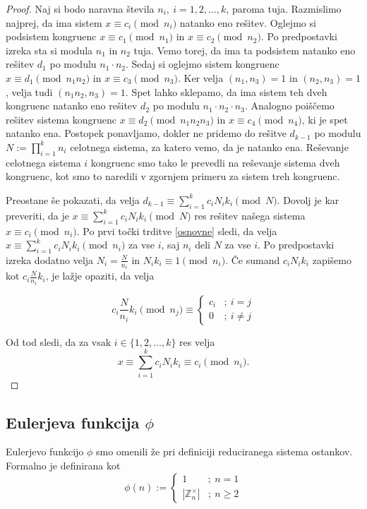 \documentclass[12pt, a4paper]{article}
\begin{document}
\begin{proof}
Naj si bodo naravna števila $n_{i},\ i=1,2,\dots,k$, paroma tuja. Razmislimo najprej, da ima sistem $x\equiv c_{i} \pmod{n_{i}}$ natanko eno rešitev. Oglejmo si podsistem kongruenc $x\equiv c_{1} \pmod{n_{1}}$ in $x\equiv c_{2} \pmod{n_{2}}$. Po predpostavki izreka sta si modula $n_{1}$ in $n_{2}$ tuja. Vemo torej, da ima ta podsistem natanko eno rešitev $d_{1}$ po modulu $n_{1}\cdot n_{2}$. Sedaj si oglejmo sistem kongruenc  $x\equiv d_{1} \pmod{n_{1} n_{2}}$ in $x\equiv c_{3} \pmod{n_{3}}$. Ker velja $(n_{1},n_{3})=1$ in $(n_{2},n_{3})=1$, velja tudi $(n_{1}n_{2},n_{3})=1$. Spet lahko sklepamo, da ima sistem teh dveh kongruenc natanko eno rešitev $d_{2}$ po modulu $n_{1}\cdot n_{2}\cdot n_{3}$. Analogno poiščemo rešitev sistema kongruenc $x\equiv d_{2} \pmod{n_{1} n_{2} n_{3}}$ in $x\equiv c_{4} \pmod{n_4}$, ki je spet natanko ena. Postopek ponavljamo, dokler ne pridemo do rešitve $d_{k-1}$ po modulu $N:=\prod_{i=1}^{k}n_{i}$ celotnega sistema, za katero vemo, da je natanko ena. Reševanje celotnega sistema $i$ kongruenc smo tako le prevedli na reševanje sistema dveh kongruenc, kot smo to naredili v zgornjem primeru za sistem treh kongruenc.

Preostane še pokazati, da velja $d_{k-1}\equiv \sum_{i=1}^{k}c_{i}N_{i}k_{i} \pmod N$. Dovolj je kar preveriti, da je $x\equiv \sum_{i=1}^{k}c_{i}N_{i}k_{i} \pmod N$ res rešitev našega sistema $x\equiv c_{i} \pmod{n_{i}}$. Po prvi točki trditve \ref{osnovne} sledi, da velja $x\equiv \sum_{i=1}^{k}c_{i}N_{i}k_{i} \pmod{n_{i}}$ za vse $i$, saj $n_{i}$ deli $N$ za vse $i$. Po predpostavki izreka dodatno velja $N_{i}=\frac{N}{n_{i}}$ in $N_{i}k_{i}\equiv 1 \pmod{n_{i}}$. Če sumand $c_{i}N_{i}k_{i}$ zapišemo kot $c_{i}\frac{N}{n_{i}}k_{i}$, je lažje opaziti, da velja

\[
 c_{i}\frac{N}{n_{i}}k_{i} \pmod{n_{j}}\equiv
\begin{cases}
c_{i} &;\ i=j \\
0 &;\ i\neq j
\end{cases}
\]

Od tod sledi, da za vsak $i\in \{1,2,\dots,k\}$ res velja
$$
x\equiv \sum_{i=1}^{k}c_{i}N_{i}k_{i} \equiv c_{i} \pmod{n_{i}}.
$$
\end{proof}

\subsection{Eulerjeva funkcija $\phi$}
 
Eulerjevo funkcijo $\phi$ smo omenili že pri definiciji reduciranega sistema ostankov. Formalno je definirana kot
\[
\phi(n):=
\begin{cases}
1 &;\ n=1 \\
|\mathbb{Z}_{n}^{\times}| &;\ n\geq 2
\end{cases}
\]
\end{document}
